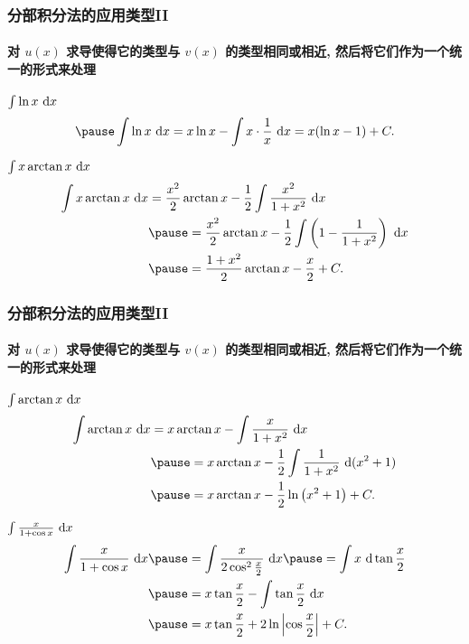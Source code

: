 \documentclass[
10pt,
aspectratio=43,
]{beamer}
\begin{document}
\begin{frame}
	\frametitle{分部积分法的应用类型II}
	\framesubtitle{对 $u(x)$ 求导使得它的类型与 $v(x)$ 的类型相同或相近, 然后将它们作为一个统一的形式来处理}
	\everymath{\displaystyle}
	\begin{exampleblock}{$\color{black}\int \ln x \mathrm{~d} x$}
		$$
		\pause \int \ln x \mathrm{~d} x=x \ln x-\int x \cdot \frac{1}{x} \mathrm{~d} x=x(\ln x-1)+C.
		$$
	\end{exampleblock}
	\pause 
	\begin{exampleblock}{$\color{black}\int x \arctan x \mathrm{~d} x$}
		\pause 
		$$
		\begin{aligned}
				\int x \arctan x \mathrm{~d} x & =\frac{x^2}{2} \arctan x-\frac{1}{2} \int \frac{x^2}{1+x^2} \mathrm{~d} x             \\
				                               & \pause =\frac{x^2}{2} \arctan x-\frac{1}{2} \int\left(1-\frac{1}{1+x^2}\right) \mathrm{~d} x \\
				                               & \pause =\frac{1+x^2}{2} \arctan x-\frac{x}{2}+C.
			\end{aligned}
		$$
	\end{exampleblock}
\end{frame}

\begin{frame}
	\frametitle{分部积分法的应用类型II}
	\framesubtitle{对 $u(x)$ 求导使得它的类型与 $v(x)$ 的类型相同或相近, 然后将它们作为一个统一的形式来处理}
	\everymath{\displaystyle}
	{\small
		\begin{exampleblock}{$\color{black}\int  \arctan x \mathrm{~d} x$}
			\pause 
			$$
				\begin{aligned}
					\int  \arctan x \mathrm{~d} x & =x \arctan x- \int \frac{x}{1+x^2} \mathrm{~d} x                  \\
					                              & \pause = x \arctan x-\frac{1}{2} \int\frac{1}{1+x^2} \mathrm{~d} (x^2+1) \\
					                              & \pause = x \arctan x-\frac{1}{2}\ln\left(x^2+1\right)+C.
				\end{aligned}
			$$
		\end{exampleblock}
		\begin{exampleblock}{$\color{black}\int \frac{x}{1+\cos x} \mathrm{~d} x$}
			\pause 
			$$
				\begin{aligned}
					\int \frac{x}{1+\cos x} \mathrm{~d} x & \pause =\int \frac{x}{2 \cos ^2 \frac{x}{2}} \mathrm{~d} x\pause =\int x \mathrm{~d} \tan \frac{x}{2} \\
					                                      & \pause =x \tan \frac{x}{2}-\int \tan \frac{x}{2} \mathrm{~d} x                                 \\
					                                      & \pause =x \tan \frac{x}{2}+2 \ln \left|\cos \frac{x}{2}\right|+C.
				\end{aligned}
			$$
		\end{exampleblock}
	}
\end{frame}
\end{document}
